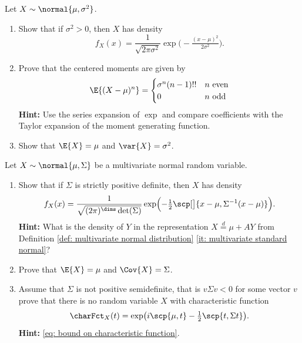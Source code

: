 \begin{exercise}
    \label{ex: density of normal distribution}
    Let \(X \sim \normal{\mu, \sigma^2}\).
    \begin{enumerate}[label=(\alph*)]
        \item \label{it: (normal distribution) density}
        Show that if \(\sigma^2 > 0\), then \(X\) has density
        \[
            f_X(x) = \frac1{\sqrt{2\pi \sigma^2}}
            \exp\bigl(-\tfrac{(x-\mu)^2}{2\sigma^2}\bigr).
        \]

        \item\label{it: (normal distribution) moments}
        Prove that the centered moments are given by
        \[
            \E{(X-\mu)^n}
            = \begin{cases}
                \sigma^n (n-1)!! & n \text{ even}
                \\
                0 & n \text{ odd}
            \end{cases}
        \]
        \textbf{Hint:} Use the series expansion of \(\exp\) and compare coefficients
        with the Taylor expansion of the moment generating function.

        \item\label{it: (normal distribution) mean and variance}
        Show that \(\E{X} = \mu\) and \(\var{X} = \sigma^2\).
    \end{enumerate}
    Let \(X \sim \normal{\mu, \Sigma}\) be a multivariate normal random variable.
    \begin{enumerate}[label=(\alph*), resume]
        \item\label{it: (multivariate normal distribution) density}
        Show that if \(\Sigma\) is strictly positive definite, then \(X\) has density
        \[
            f_X(x)
            = \frac1{\sqrt{(2\pi)^\dims \det(\Sigma)}}
            \exp\Bigl(-\tfrac12 \scp[\big]{x - \mu, \Sigma^{-1}(x - \mu)}\Bigr).
        \]
        \textbf{Hint:} What is the density of \(Y\) in the representation \(X
        \overset{d}= \mu + A Y\) from Definition \ref{def: multivariate normal
        distribution} \ref{it: multivariate standard normal}?
        
        \item\label{it: (multivariate normal distribution) mean and covariance}
        Prove that \(\E{X} = \mu\) and \(\Cov{X} = \Sigma\).

        \item\label{it: (multivariate normal distribution) non-positive semidefinite}
        Assume that \(\Sigma\) is not positive semidefinite, that is
        \(v \Sigma v < 0\) for some vector \(v\) prove that there is no random
        variable \(X\) with characteristic function
        \[
            \charFct_X(t)
            = \exp\bigl(i \scp{\mu, t} - \tfrac12 \scp{t, \Sigma t}\bigr).
        \]
        \textbf{Hint:} \eqref{eq: bound on characteristic function}.
    \end{enumerate}
\end{exercise}
